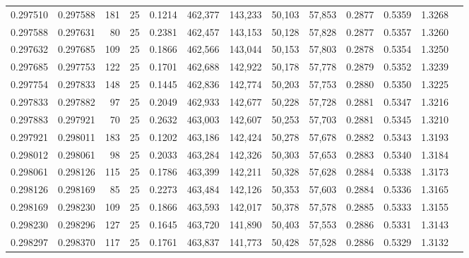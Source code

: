 \begin{tabular}{rrrrrrrrrrrrr}
0.297510 & 0.297588 &   181 &  25 &                                     0.1214 & 462,377 & 143,233 &  50,103 &  57,853 & 0.2877 & 0.5359 & 1.3268 \\
0.297588 & 0.297631 &    80 &  25 &                                     0.2381 & 462,457 & 143,153 &  50,128 &  57,828 & 0.2877 & 0.5357 & 1.3260 \\
0.297632 & 0.297685 &   109 &  25 &                                     0.1866 & 462,566 & 143,044 &  50,153 &  57,803 & 0.2878 & 0.5354 & 1.3250 \\
0.297685 & 0.297753 &   122 &  25 &                                     0.1701 & 462,688 & 142,922 &  50,178 &  57,778 & 0.2879 & 0.5352 & 1.3239 \\
0.297754 & 0.297833 &   148 &  25 &                                     0.1445 & 462,836 & 142,774 &  50,203 &  57,753 & 0.2880 & 0.5350 & 1.3225 \\
0.297833 & 0.297882 &    97 &  25 &                                     0.2049 & 462,933 & 142,677 &  50,228 &  57,728 & 0.2881 & 0.5347 & 1.3216 \\
0.297883 & 0.297921 &    70 &  25 &                                     0.2632 & 463,003 & 142,607 &  50,253 &  57,703 & 0.2881 & 0.5345 & 1.3210 \\
0.297921 & 0.298011 &   183 &  25 &                                     0.1202 & 463,186 & 142,424 &  50,278 &  57,678 & 0.2882 & 0.5343 & 1.3193 \\
0.298012 & 0.298061 &    98 &  25 &                                     0.2033 & 463,284 & 142,326 &  50,303 &  57,653 & 0.2883 & 0.5340 & 1.3184 \\
0.298061 & 0.298126 &   115 &  25 &                                     0.1786 & 463,399 & 142,211 &  50,328 &  57,628 & 0.2884 & 0.5338 & 1.3173 \\
0.298126 & 0.298169 &    85 &  25 &                                     0.2273 & 463,484 & 142,126 &  50,353 &  57,603 & 0.2884 & 0.5336 & 1.3165 \\
0.298169 & 0.298230 &   109 &  25 &                                     0.1866 & 463,593 & 142,017 &  50,378 &  57,578 & 0.2885 & 0.5333 & 1.3155 \\
0.298230 & 0.298296 &   127 &  25 &                                     0.1645 & 463,720 & 141,890 &  50,403 &  57,553 & 0.2886 & 0.5331 & 1.3143 \\
0.298297 & 0.298370 &   117 &  25 &                                     0.1761 & 463,837 & 141,773 &  50,428 &  57,528 & 0.2886 & 0.5329 & 1.3132 \\

\end{tabular}
